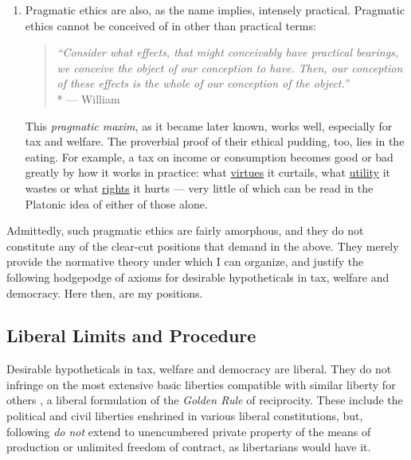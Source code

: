 \begin{description}
\begin{enumerate}
		\item
		Pragmatic ethics are also, as the name implies, intensely practical.
		Pragmatic ethics cannot be conceived of in other than practical terms:

		\begin{quote}
			\emph{``Consider what effects, that might conceivably have practical bearings, we conceive the object of our conception to have.
			Then, our conception of these effects is the whole of our conception of the object.''}
			\\*
			--- William \citet[293]{Peirce1878}
		\end{quote}

		This \emph{pragmatic maxim}, as it became later known, works well, especially for tax and welfare.
		The proverbial proof of their ethical pudding, too, lies in the eating.
		For example, a tax on income or consumption becomes good or bad greatly by how it works in practice:
		what \hyperref[itm:virtue]{virtues} it curtails, what \hyperref[itm:consequentialism]{utility} it wastes or what \hyperref[itm:deontological]{rights} it hurts --- very little of which can be read in the Platonic idea of either of those alone.
	\end{enumerate}
\end{description}

Admittedly, such pragmatic ethics are fairly amorphous, and they do not constitute any of the clear-cut positions that \citeauthor{Zizek2003} demand in the above.
They merely provide the normative theory under which I can organize, and justify the following hodgepodge of axioms for desirable hypotheticals in tax, welfare and democracy.
Here then, are my positions.

\subsection[Liberal]{Liberal Limits and Procedure}
	\label{sec:liberal}
Desirable hypotheticals in tax, welfare and democracy are liberal.
They do not infringe on the most extensive basic liberties compatible with similar liberty for others \citep{Rawls-1971}, a liberal formulation of the \emph{Golden Rule} of reciprocity.
These include the political and civil liberties enshrined in various liberal constitutions, but, following \citeauthor{Rawls-1971} \emph{do not} extend to unencumbered private property of the means of production or unlimited freedom of contract, as libertarians would have it.

